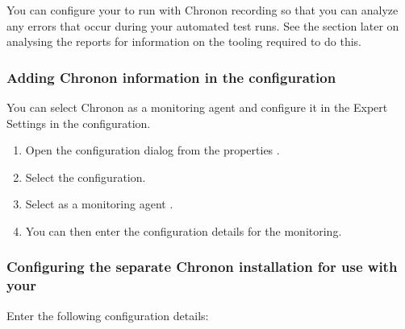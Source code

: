 
You can configure your \gdaut{} to run with Chronon recording so that you can analyze any errors that occur during your automated test runs. See the section later  on analysing the reports for information on the tooling required to do this.


\subsubsection{Adding Chronon information in the \gdaut{} configuration}
You can select Chronon as a monitoring agent and configure it in the Expert Settings in the \gdaut{} configuration. 

\begin{enumerate}
\item Open the \gdaut{} configuration dialog from the \gdproject{} properties .
\item Select the  configuration. 
\item Select  as a monitoring agent . 
\item You can then enter the configuration details for the monitoring.
\end{enumerate}

\subsubsection{Configuring the separate Chronon installation for use with your \gdaut{}}
\label{TasksChrononAUTSeparate}

Enter the following configuration details:

